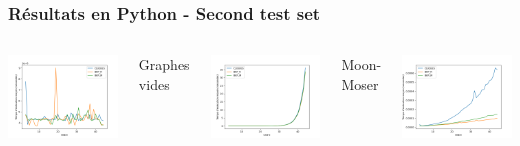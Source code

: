 \documentclass{beamer}
\begin{document}
\begin{frame}
  \frametitle{Résultats en Python - Second test set}
  \begin{columns}
    \centering
    \includegraphics[width=\textwidth]{images/total_pivot_empty_plot.png}
    \caption{Graphes vides}
    \centering
    \includegraphics[width=\textwidth]{images/total_pivot_turan_plot.png}
    \caption{Moon-Moser}
    \centering
    \includegraphics[width=\textwidth]{images/total_pivot_complete_plot.png}

\end{columns}
\end{frame}
\end{document}

